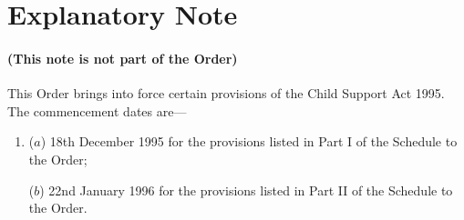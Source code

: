 \documentclass[a4paper]{article}
\newcommand{\parthead}{}
\begin{document}
\part{Explanatory Note}

\renewcommand\parthead{--- Explanatory Note}

\subsection*{(This note is not part of the Order)}

This Order brings into force certain provisions of the Child Support Act 1995. The commencement dates are—
\begin{enumerate}\item[]
 ($a$) 18th December 1995 for the provisions listed in Part I of the Schedule to the Order;

 ($b$) 22nd January 1996 for the provisions listed in Part II of the Schedule to the Order.
\end{enumerate}
\end{document}
